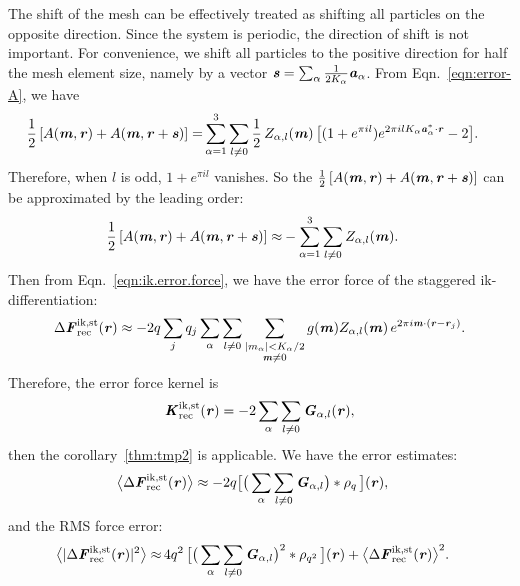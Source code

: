 \documentclass[aps,pre,preprint,unsortedaddress]{revtex4}
\renewcommand{\v}[1]{\textbf{\textit{#1}}}
\begin{document}
The shift of the mesh can be effectively treated as shifting all
particles on the opposite direction. Since the system is periodic,
the direction of shift is not important. For convenience, we shift
all particles to the positive direction for half the mesh element size, namely
by a vector $\v s = \sum_\alpha\frac1{2K_\alpha}\v a_\alpha$. From
Eqn.~\eqref{eqn:error-A}, we have
\begin{align}
  \frac12\, [A(\v m, \v r) + A(\v m, \v r+\v s)]
  =&
  \sum_{\alpha=1}^3\sum_{l\neq 0}
  \frac12\,
  Z_{\alpha,l}(\v m)\,
  \big[
  (1 + e^{\pi i l})e^{2\pi i l K_\alpha\v a^\ast_\alpha\cdot \v r} - 2
  \big].
\end{align}
Therefore, when $l$ is odd, $1 + e^{\pi i l}$ vanishes. So the $\frac12\,[A(\v
m, \v r) + A(\v m, \v r+\v s)]$ can be approximated by the leading
order:
\begin{align}
  \frac12\, [A(\v m, \v r) + A(\v m, \v r+\v s)]
  \approx&
  -\sum_{\alpha=1}^3\sum_{l\neq 0}
  Z_{\alpha,l}(\v m).
\end{align}
Then from Eqn.~\eqref{eqn:ik.error.force}, we have the error force of
the staggered ik-differentiation:
\begin{align}\label{eqn:ik-st-error-force}
  \Delta\v F^{\textrm{ik,st}}_{\textrm{rec}}(\v r)
  \approx -2q
  \sum_jq_j
  \sum_\alpha\sum_{l\neq 0}
  \sum_{
    \begin{subarray}{c}
      \vert m_{\alpha}\vert < K_\alpha/2\\
      \v m\neq 0
    \end{subarray}}
  g(\v m) Z_{\alpha,l}(\v m)\,e^{2\pi i\v m\cdot(\v r-\v r_j)}.
\end{align}
Therefore, the error force kernel is
\begin{align}
  \v K^{\textrm{ik,st}}_{\textrm{rec}}(\v r)
  = -2
  \sum_\alpha\sum_{l\neq 0}\v G_{\alpha,l}(\v r),
\end{align}
then the corollary~\ref{thm:tmp2} is applicable.
We have the error estimates:
\begin{align}\label{eqn:ik.st.meanf}
  \big\langle
  \Delta\v F_{\textrm{rec}}^{\textrm{ik,st}}(\v r)
  \big\rangle
  & \approx
  - 2 q
  \big[
  \big(
  \sum_{\alpha}\sum_{l\neq 0}\v G_{\alpha,l}
  \big)
  \ast\rho_q\,
  \big] (\v r),
\end{align}
and the RMS force error:
\begin{align}\label{eqn:ik.st.error}
  \big\langle
  \vert\Delta\v F_{\textrm{rec}}^{\textrm{ik,st}}(\v r)\vert^2
  \big\rangle
  \approx&\,
  4q^2\,
  \big[
  \big(
  \sum_{\alpha} \sum_{l\neq 0}  
  \v G_{\alpha,l}
  \big)^2
  \ast \rho_{q^2}\,
  \big] (\v r) +
  \big\langle
  \Delta\v F_{\textrm{rec}}^{\textrm{ik,st}}(\v r)
  \big\rangle^2.
\end{align}
\end{document}
